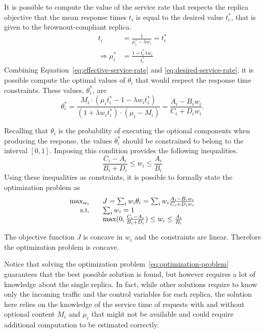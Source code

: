 It is possible to compute the value of the service rate that respects
the replica objective that the mean response times $t_i$ is equal to
the desired value $t_i^*$, that is given to the brownout-compliant
replica.
\begin{align}
  t_i & = \frac{1}{\mu_i^*-\lambda w_i} = t_i^* \\
  \Longrightarrow \mu_i^* & = \frac{1+t_i^*\lambda w_i}{t_i^*} 
  \label{eq:desired-service-rate}
\end{align}
Combining Equation~\eqref{eq:effective-service-rate} and
\eqref{eq:desired-service-rate}, it is possible compute the optimal
values of $\theta_i$ that would respect the response time
constraints. These values, $\theta_i^*$, are
\begin{equation}
  \theta_i^* = \frac{M_i \cdot \left( \mu_i t_i^* - 1 -\lambda w_i
      t_i^* \right)}{{\left( 1+\lambda w_i t_i^* \right) \cdot
      \left(\mu_i-M_i \right)}} = \frac{A_i - B_i w_i}{C_i + D_i w_i}.
  \label{eq:optimal-thetas}
\end{equation}

Recalling that $\theta_i$ is the probability of executing the optional
components when producing the response, the values $\theta_i^*$ should
be constrained to belong to the interval $[0, 1]$. Imposing this
condition provides the following inequalities.
\begin{equation}
  \frac{C_i-A_i}{B_i+D_i} \leq w_i \leq \frac{A_i}{B_i}
  \label{eq:constraints-optimal-thetas}
\end{equation}
Using these inequalities as constraints, it is possible to formally
state the optimization problem as
\begin{equation}
\begin{array}{rl}
  \max_{w_i} \;\;\; & J = \sum_i w_i \theta_i = \sum_i w_i  \frac{A_i - B_i w_i}{C_i + D_i w_i} \\
  \textnormal{s.t.} \;\;\; & \sum_i w_i = 1 \\
  & \max (0,\frac{C_i-A_i}{B_i+D_i}) \leq w_i \leq \frac{A_i}{B_i}
\end{array}
  \label{eq:optimization-problem}
\end{equation}

The objective function $J$ is concave in $w_i$ and the constraints are
linear.  Therefore the optimization problem is
concave. 

Notice that solving the optimization
problem~\eqref{eq:optimization-problem} guarantees that the best
possible solution is found, but however requires a lot of knowledge
about the single replica. In fact, while other solutions require to
know only the incoming traffic and the control variables for each
replica, the solution here relies on the knowledge of the service time
of requests with and without optional content $M_i$ and $\mu_i$ that
might not be available and could require additional computation to be
estimated correctly.
